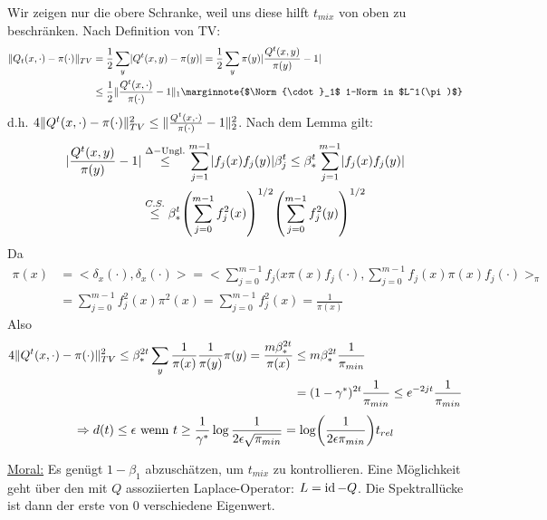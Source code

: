 \begin{beweis}
	Wir zeigen nur die obere Schranke, weil uns diese hilft $t_{mix}$ von oben zu beschränken. Nach Definition von TV:
	\begin{align}
		\Norm{Q_t(x, \cdot) - \pi(\cdot)}_{TV} &= \frac{1}{2} \sum\limits_{y} \abs{Q^t(x,y) - \pi(y)} = \frac{1}{2} \sum\limits_{y} \pi(y) \abs{\frac{Q^t(x,y)}{\pi(y)} -1} \\
						&\leq \frac{1}{2} \Norm{\frac{Q^t(x,\cdot)}{\pi(\cdot)} -1 }_1  \marginnote{$\Norm{\cdot}_1$ 1-Norm in $L^1(\pi)$} 
	\end{align}
	d.h. $4 \lVert Q^t(x,\cdot) - \pi(\cdot )\rVert^2_{TV} \leq \lVert\frac{Q^t(x,\cdot)}{\pi(\cdot)} -1\rVert^2_2$.  Nach dem Lemma gilt:
	\begin{align}
		\abs{\frac{Q^t(x,y)}{\pi(y)} -1} &\overset{\Delta-\text{Ungl.}}{\leq} \sum\limits_{j =  1}^{m-1} \abs{f_j(x) f_j(y)} \beta^t_j \leq \beta^t_* \sum\limits_{j=1}^{m-1} \abs{f_j(x) f_j(y)} \\
			&\overset{C.S.}{\leq} \beta^t_* \enb{\sum\limits_{j = 0}^{m-1} f_j^2(x)}^{1/2} \enb{\sum\limits_{j = 0}^{m-1} f_j^2(y)}^{1/2}
	\end{align}
	Da \begin{align}
		\pi(x) &= <\delta_x(\cdot),\delta_x(\cdot)> = <\sum\limits_{j = 0}^{m-1}f_j(x \pi(x) f_j(\cdot), \sum\limits_{j = 0}^{m-1} f_j(x) \pi(x) f_j(\cdot)>_\pi \\
			&=\sum\limits_{j = 0}^{m-1} f_j^2(x)\pi^2(x) = \sum\limits_{j=0}^{m-1} f_j^2(x) = \frac{1}{\pi(x)}
	\end{align}
	Also
	\begin{align}
		4 \lVert Q^t (x,\cdot) - \pi(\cdot) \rVert^2_{TV} \leq \beta^{2t}_* \sum\limits_{y}\frac{1}{\pi(x)} \frac{1}{\pi(y)} \pi(y) = \frac{m \beta^{2t}_*}{\pi(x)} &\leq m \beta^{2t}_* \frac{1}{\pi_{min}} \\
		&= (1-\gamma^*)^{2t} \frac{1}{\pi_{min}} \leq e^{-2jt} \frac{1}{\pi_{min}} \\
	\end{align}
	\begin{align}
		\Rightarrow d(t) \leq \epsilon \text{ wenn } t \geq \frac{1}{\gamma^*} \log \frac{1}{2\epsilon \sqrt{\pi_{min}}} = \log \enb{\frac{1}{2\epsilon\pi_{min}}} t_{rel}
	\end{align}
\end{beweis}

\underline{Moral:} Es genügt $1-\beta_1$ abzuschätzen, um $t_{mix}$ zu kontrollieren. Eine Möglichkeit geht über den mit $Q$ assoziierten Laplace-Operator: $L = \operatorname{id} -Q$. Die Spektrallücke ist dann der erste von 0 verschiedene Eigenwert.

